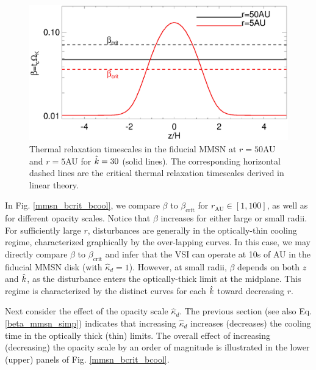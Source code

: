 
\begin{figure}
  \includegraphics[width=\linewidth,clip=true,trim=0cm 0cm 0cm
  0cm]{figures/beta_compare}
  \caption{Thermal relaxation timescales in the fiducial MMSN at $r=50$AU
    and $r=5$AU for $\hat{k}=30$ (solid lines). The
    corresponding horizontal dashed lines are the critical thermal
    relaxation timescales derived in linear theory. 
    \label{beta_compare}}
\end{figure}


In Fig. \ref{mmsn_bcrit_bcool}, we compare $\beta$ to
$\beta_\mathrm{crit}$ for $r_\mathrm{AU}\in[1,100]$, as well as for different
opacity scales. Notice that $\beta$ increases for either large or
small radii. For sufficiently large $r$, disturbances are generally
in the optically-thin cooling regime, characterized graphically by the
over-lapping curves. 
In this case, we may
directly compare $\beta$ to $\beta_\mathrm{crit}$ and infer that the
VSI can operate at 10s of AU in the fiducial MMSN disk (with
$\hat{\kappa}_d=1$).  However, at small radii, $\beta$ depends on both
$z$ and $\hat{k}$, as the disturbance enters the optically-thick limit
at the midplane. This regime is characterized by the distinct curves for each
$\hat{k}$ toward decreasing $r$.  
  
 
Next consider the effect of the opacity scale $\hat{\kappa}_d$. The previous section
(see also Eq. \ref{beta_mmsn_simp}) indicates that increasing $\hat{\kappa}_d$
increases (decreases) the cooling time in the optically thick (thin)
limits. The overall effect of  increasing (decreasing) the opacity
scale by an order of magnitude is illustrated in the lower (upper)
panels of Fig. \ref{mmsn_bcrit_bcool}. 

